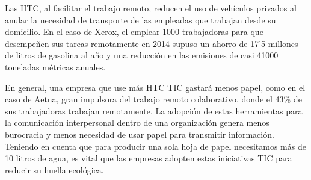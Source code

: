 Las HTC, al facilitar el trabajo remoto, reducen el uso de vehículos privados al anular la necesidad de transporte de las empleadas que trabajan desde su domicilio. En el caso de Xerox, el emplear 1000 trabajadoras para que desempeñen sus tareas remotamente en 2014 supuso un ahorro de 17’5 millones de litros de gasolina al año y una reducción en las emisiones de casi 41000 toneladas métricas anuales\cite{adrianne}.

En general, una empresa que use más HTC TIC gastará menos papel, como en el caso de Aetna, gran impulsora del trabajo remoto colaborativo, donde el 43\% de sus trabajadoras trabajan remotamente\cite{adrianne}. La adopción de estas herramientas para la comunicación interpersonal dentro de una organización genera menos burocracia y menos necesidad de usar papel para transmitir información. Teniendo en cuenta que para producir una sola hoja de papel necesitamos más de 10 litros de agua\cite{megan}, es vital que las empresas adopten estas iniciativas TIC para reducir su huella ecológica.
